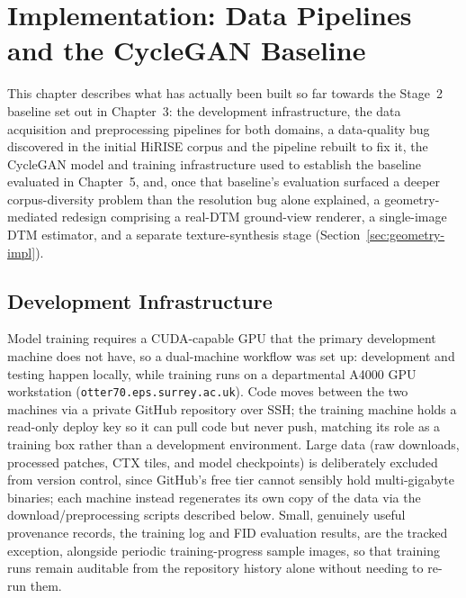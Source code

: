 \chapter{Implementation: Data Pipelines and the CycleGAN Baseline}
\label{ch:implementation}

This chapter describes what has actually been built so far towards the Stage~2 baseline set out in Chapter~3: the development infrastructure, the data acquisition and preprocessing pipelines for both domains, a data-quality bug discovered in the initial HiRISE corpus and the pipeline rebuilt to fix it, the CycleGAN model and training infrastructure used to establish the baseline evaluated in Chapter~5, and, once that baseline's evaluation surfaced a deeper corpus-diversity problem than the resolution bug alone explained, a geometry-mediated redesign comprising a real-DTM ground-view renderer, a single-image DTM estimator, and a separate texture-synthesis stage (Section~\ref{sec:geometry-impl}).

\section{Development Infrastructure}

Model training requires a CUDA-capable GPU that the primary development machine does not have, so a dual-machine workflow was set up: development and testing happen locally, while training runs on a departmental A4000 GPU workstation (\texttt{otter70.eps.surrey.ac.uk}). Code moves between the two machines via a private GitHub repository over SSH; the training machine holds a read-only deploy key so it can pull code but never push, matching its role as a training box rather than a development environment. Large data (raw downloads, processed patches, CTX tiles, and model checkpoints) is deliberately excluded from version control, since GitHub's free tier cannot sensibly hold multi-gigabyte binaries; each machine instead regenerates its own copy of the data via the download/preprocessing scripts described below. Small, genuinely useful provenance records, the training log and FID evaluation results, are the tracked exception, alongside periodic training-progress sample images, so that training runs remain auditable from the repository history alone without needing to re-run them.

